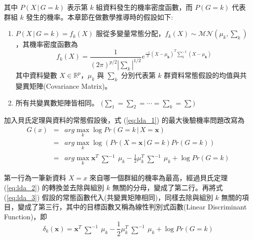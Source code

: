 其中 $P(X\,|\,G = k)$ 表示第 $k$ 組資料發生的機率密度函數，而 $P(G = k)$ 代表群組 $k$ 發生的機率。本章節在做數學推導時的假設如下:
\begin{tcolorbox}[title = {模型假設}]
\begin{enumerate}
\item
$P(X \,|\, G = k) = f_k(X)$ 服從多變量常態分配，$f_k(X) \sim \mathcal{MN}(\mu_k, \sum_k)$，其機率密度函數為
\begin{equation}\label{eq:lda_3}
f_k(X) = \frac{1}{(2\pi)^{p/2}|\sum_k|^{1/2}}e^{\frac{-1}{2}(X - \mu_{\mathbf{k}})^T \sum_k^{-1}(X - \mu_{\mathbf{k}})}
\end{equation}
其中資料變數 $X \in \mathbb{R}^p$，$\mu_k$ 與 $\sum_k$ 分別代表第 $k$ 群資料常態假設的均值與共變異矩陣(Covariance Matrix)。
\item
所有共變異數矩陣皆相同。 $\bigg(\sum_1 = \sum_2 = \cdots = \sum_k = \sum \bigg)$
\end{enumerate}
\end{tcolorbox}

加入貝氏定理與資料的常態假設後，式 (\ref{eq:lda_1}) 的最大後驗機率問題改寫為
\begin{eqnarray}
G(x) 
& = &
arg\mathop{max} \limits_k \log Pr(G = k\,|\,X = \mathbf{x}) \nonumber \\
& = & arg\mathop{max} \limits_k \log (Pr(X = \mathbf{x}\,|\,G = k)Pr(G = k)) \nonumber \\
& = & arg\mathop{max} \limits_k \mathbf{x}^T \begin{matrix} \sum^{-1}\end{matrix} \mu_k - \frac{1}{2} \mu_k^T \begin{matrix} \sum^{-1} \end{matrix} \mu_k + \log Pr(G = k) 
\end{eqnarray}

第一行為一筆新資料 $X = x$ 來自哪一個群組的機率為最高，經過貝氏定理 (\ref{eq:lda_2}) 的轉換並去除與組別 $k$ 無關的分母，變成了第二行。再將式 (\ref{eq:lda_3}) 假設的常態函數代入(共變異矩陣相同)，同樣去除與組別 $k$ 無關的項目，變成了第三行，其中的目標函數又稱為線性判別式函數(Linear Discriminant Function)，即
\begin{equation}\label{eq:lda_5}
\delta_k(\mathbf{x}) = \mathbf{x}^T \begin{matrix} \sum^{-1}\end{matrix} \mu_k - \frac{1}{2} \mu_k^T \begin{matrix} \sum^{-1} \end{matrix} \mu_k + \log Pr(G = k) 
\end{equation}

